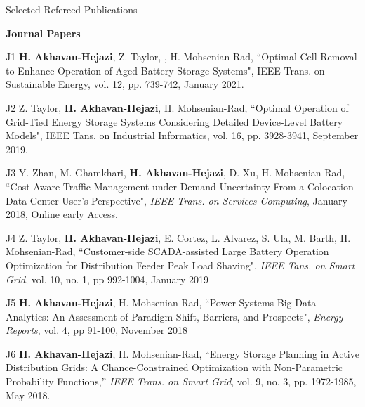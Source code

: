 \documentclass{resume} %
\begin{document}
\begin{rSection}{ Selected Refereed Publications}

{\bf Journal Papers}
\item [J1]  {\bf H.  Akhavan-Hejazi}, Z. Taylor, ,  H. Mohsenian-Rad, ``Optimal Cell Removal to Enhance Operation of Aged Battery Storage Systems",  IEEE Trans. on Sustainable Energy, vol. 12, pp. 739-742, January 2021.

\item [J2]  Z. Taylor, {\bf H.  Akhavan-Hejazi},  H. Mohsenian-Rad, ``Optimal Operation of Grid-Tied Energy Storage Systems Considering Detailed Device-Level Battery Models", IEEE Tans. on Industrial Informatics, vol. 16, pp. 3928-3941, September 2019. 

\item [J3]	Y. Zhan, M. Ghamkhari, {\bf H. Akhavan-Hejazi}, D. Xu, H. Mohsenian-Rad, ``Cost-Aware Traffic Management under Demand Uncertainty From a Colocation Data Center User's Perspective", \emph{IEEE Trans. on Services Computing},   January 2018, Online early Access. 

 \item [J4]  Z. Taylor, {\bf H.  Akhavan-Hejazi}, E. Cortez, L.  Alvarez,  S. Ula,  M. Barth,  H. Mohsenian-Rad, ``Customer-side SCADA-assisted Large Battery Operation Optimization for Distribution Feeder Peak Load Shaving",\emph{ IEEE Tans. on Smart Grid}, vol. 10, no. 1, pp 992-1004, January 2019
 
\item [J5] {\bf H. Akhavan-Hejazi}, H. Mohsenian-Rad, ``Power Systems Big Data Analytics: An Assessment of Paradigm Shift, Barriers, and Prospects",   \emph{Energy  Reports},  vol. 4, pp 91-100, November 2018
  

 
 \item [J6] {\bf H. Akhavan-Hejazi},  H. Mohsenian-Rad, ``Energy Storage Planning in Active Distribution Grids: A Chance-Constrained Optimization with Non-Parametric Probability Functions,'' \emph{IEEE Trans. on Smart Grid}, vol. 9, no. 3, pp. 1972-1985, May 2018.





\end{rSection}
\end{document}
